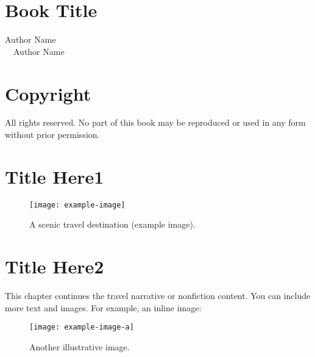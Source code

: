\documentclass[10pt]{book}
\begin{document}
\frontmatter

\chapter*{\centering \Huge Book Title}
\thispagestyle{empty}   %
\vspace{1em}
\begin{center}
  {\Large Author Name}\\[1ex]
  {\normalsize \textcopyright\ \the\year\ Author Name}
\end{center}
\newpage

\chapter*{Copyright}
\noindent All rights reserved. No part of this book may be reproduced or used 
in any form without prior permission.
\newpage

\tableofcontents

\mainmatter

\chapter{Title Here1}
\lipsum[1]  %

\begin{figure}[htbp]
  \centering
  \texttt{[image: example-image]} %
  \caption{A scenic travel destination (example image).}
\end{figure}

\lipsum[1]  %

\lipsum[2]  %

\chapter{Title Here2}
This chapter continues the travel narrative or nonfiction content. You can include more text and images. For example, an inline image:
\begin{figure}[htbp]
  \centering
  \texttt{[image: example-image-a]} 
  \caption{Another illustrative image.}
\end{figure}

\end{document}

